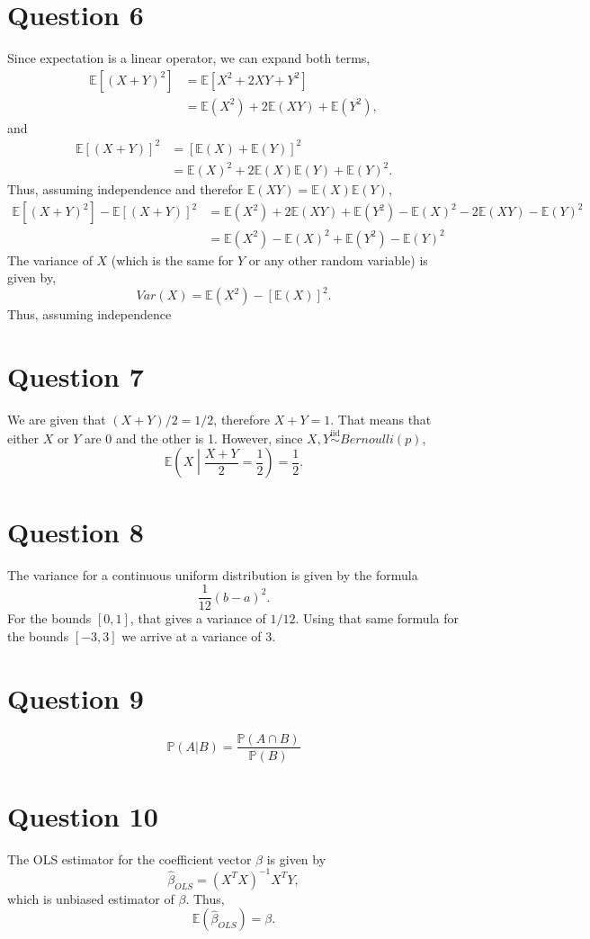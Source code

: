 \documentclass[titlepage, 12pt, leqno]{article}
\begin{document}
\section*{Question 6}
Since expectation is a linear operator, we can expand both terms,
\begin{align*}
    \mathbb{E}[(X+Y)^{2}] &= \mathbb{E}[X^{2} + 2XY + Y^{2}] \\
                          &= \mathbb{E}(X^{2}) + 2\mathbb{E}(XY) + 
                          \mathbb{E}(Y^{2}),
\end{align*}
and
\begin{align*}
    \mathbb{E}[(X+Y)]^{2} &= [\mathbb{E}(X) + \mathbb{E}(Y)]^{2} \\
                          &= \mathbb{E}(X)^{2} + 2\mathbb{E}(X)\mathbb{E}(Y) + 
                          \mathbb{E}(Y)^{2}.
\end{align*}
Thus, assuming independence and therefor $\mathbb{E}(XY) = \mathbb{E}(X)
\mathbb{E}(Y)$,
\begin{align*}
    \mathbb{E}[(X+Y)^{2}] - \mathbb{E}[(X+Y)]^{2} &= \mathbb{E}(X^{2}) + 
    2\mathbb{E}(XY)  + \mathbb{E}(Y^{2}) - \mathbb{E}(X)^{2} - 2\mathbb{E}(XY)
    - \mathbb{E}(Y)^{2} \\
    &= \mathbb{E}(X^{2}) - \mathbb{E}(X)^{2} + \mathbb{E}(Y^{2}) -
    \mathbb{E}(Y)^{2}
\end{align*}
The variance of $X$ (which is the same for $Y$ or any other random 
variable) is given by,
\[
Var(X) = \mathbb{E}(X^{2}) - [\mathbb{E}(X)]^{2}.
\]
Thus, assuming independence

\section*{Question 7}
We are given that $(X+Y)/2 = 1/2$, therefore $X + Y = 1$. That means that either
 $X$ or $Y$ are 0 and the other is 1. However, since 
 $X,Y\overset{\mathrm{iid}}{\sim}Bernoulli(p)$,
\[
\mathbb{E}\left(X \middle| \frac{X+Y}{2} = \frac{1}{2}\right) = \frac{1}{2}.
\]

\section*{Question 8}
The variance for a continuous uniform distribution is given by the formula
\[
\frac{1}{12}(b-a)^{2}.
\]
For the bounds $[0,1]$, that gives a variance of $1/12$. Using that same
formula for the bounds $[-3,3]$ we arrive at a variance of 3.

\section*{Question 9}
\[
\mathbb{P}(A|B) = \frac{\mathbb{P}(A \cap B)}{\mathbb{P}(B)}
\]

\section*{Question 10}
The OLS estimator for the coefficient vector $\beta$ is given by
\[
\hat \beta_{OLS} = (X^{T}X)^{-1}X^{T}Y,
\]
which is unbiased estimator of $\beta$. Thus,
\[
\mathbb{E}(\hat \beta_{OLS}) = \beta.
\]
\end{document}
